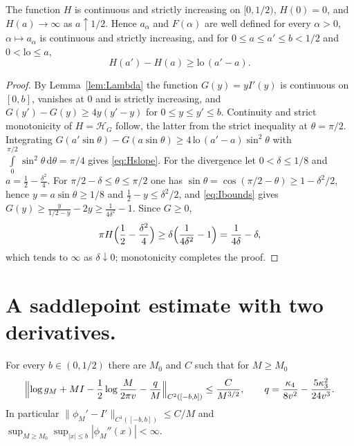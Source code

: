 \documentclass{math}
\let\TJMoriginalint\int
\renewcommand{\int}{\TJMoriginalint\limits}
\newcommand{\dd}{\,\mathrm d}
\begin{document}
\begin{lemma}\label{lem:H}
The function $H$ is continuous and strictly increasing on $[0,1/2)$, $H(0)=0$, and $H(a)\to\infty$ as $a\uparrow1/2$. Hence $a_\alpha$ and $F(\alpha)$ are well defined for every $\alpha>0$, $\alpha\mapsto a_\alpha$ is continuous and strictly increasing, and for $0\le a\le a'\le b<1/2$ and $0<\mathrm{lo}\le a$,
\begin{equation}\label{eq:Hslope}
H(a')-H(a)\ge\mathrm{lo}\,(a'-a).
\end{equation}
\end{lemma}

\begin{proof}
By Lemma~\ref{lem:Lambda} the function $G(y)=yI'(y)$ is continuous on $[0,b]$, vanishes at $0$ and is strictly increasing, and $G(y')-G(y)\ge4y(y'-y)$ for $0\le y\le y'\le b$. Continuity and strict monotonicity of $H=\mathcal H_G$ follow, the latter from the strict inequality at $\theta=\pi/2$. Integrating $G(a'\sin\theta)-G(a\sin\theta)\ge4\,\mathrm{lo}\,(a'-a)\sin^2\theta$ with $\int_0^{\pi/2}\sin^2\theta\dd\theta=\pi/4$ gives \eqref{eq:Hslope}. For the divergence let $0<\delta\le1/8$ and $a=\frac12-\frac{\delta^2}4$. For $\pi/2-\delta\le\theta\le\pi/2$ one has $\sin\theta=\cos(\pi/2-\theta)\ge1-\delta^2/2$, hence $y=a\sin\theta\ge1/8$ and $\frac12-y\le\delta^2/2$, and \eqref{eq:Ibounds} gives $G(y)\ge\frac{y}{1/2-y}-2y\ge\frac1{4\delta^2}-1$. Since $G\ge0$,
\begin{equation}\label{eq:Hdiv}
\pi H\Bigl(\frac12-\frac{\delta^2}4\Bigr)\ge\delta\Bigl(\frac1{4\delta^2}-1\Bigr)=\frac1{4\delta}-\delta ,
\end{equation}
which tends to $\infty$ as $\delta\downarrow0$; monotonicity completes the proof.
\end{proof}

\section{A saddlepoint estimate with two derivatives.}\label{sec:saddle}
\begin{lemma}\label{lem:saddle}
For every $b\in(0,1/2)$ there are $M_0$ and $C$ such that for $M\ge M_0$
\begin{equation}\label{eq:saddle}
\Bigl\|\log g_M+MI-\frac12\log\frac{M}{2\pi v}-\frac qM\Bigr\|_{C^2([-b,b])}\le\frac C{M^{3/2}},\qquad q=\frac{\kappa_4}{8v^2}-\frac{5\kappa_3^2}{24v^3} .
\end{equation}
In particular $\|\phi_M'-I'\|_{C^1([-b,b])}\le C/M$ and $\sup_{M\ge M_0}\sup_{|x|\le b}|\phi_M''(x)|<\infty$.
\end{lemma}
\end{document}
